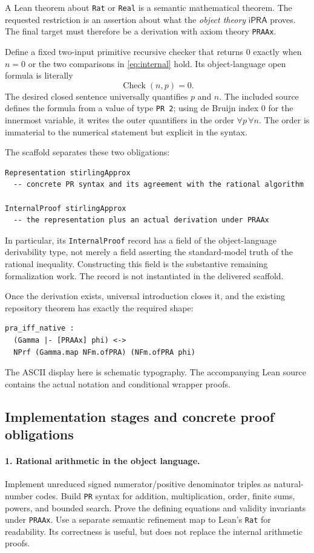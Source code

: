 \documentclass[11pt]{article}
\theoremstyle{definition}
\newcommand{\ipra}{\mathsf{iPRA}}
\newcommand{\ArithCheck}{\operatorname{Check}}
\begin{document}
A Lean theorem about \texttt{Rat} or \texttt{Real} is a semantic
mathematical theorem. The requested restriction is an assertion about what
the \emph{object theory} $\ipra$ proves. The final target must therefore
be a derivation with axiom theory \texttt{PRAAx}.

Define a fixed two-input primitive recursive checker that returns $0$
exactly when $n=0$ or the two comparisons in \eqref{eq:internal}
hold. Its object-language open formula is literally
\[
 \ArithCheck(n,p)=0.
\]
The desired closed sentence universally quantifies $p$ and $n$.
The included source defines the formula from a value of type
\texttt{PR 2}; using de Bruijn index $0$ for the innermost variable,
it writes the outer quantifiers in the order $\forall p\,\forall n$.
The order is immaterial to the numerical statement but explicit in the
syntax.

The scaffold separates these two obligations:
\begin{lstlisting}
Representation stirlingApprox
  -- concrete PR syntax and its agreement with the rational algorithm

InternalProof stirlingApprox
  -- the representation plus an actual derivation under PRAAx
\end{lstlisting}
In particular, its \texttt{InternalProof} record has a field of the
object-language derivability type, not merely a field asserting the
standard-model truth of the rational inequality. Constructing this field
is the substantive remaining formalization work. The record is not
instantiated in the delivered scaffold.

Once the derivation exists, universal introduction closes it, and the
existing repository theorem has exactly the required shape:
\begin{lstlisting}
pra_iff_native :
  (Gamma |- [PRAAx] phi) <->
  NPrf (Gamma.map NFm.ofPRA) (NFm.ofPRA phi)
\end{lstlisting}
The ASCII display here is schematic typography. The accompanying Lean
source contains the actual notation and conditional wrapper proofs.

\subsection{Implementation stages and concrete proof obligations}

\paragraph{1. Rational arithmetic in the object language.}
Implement unreduced signed numerator/positive denominator triples as
natural-number codes. Build \texttt{PR} syntax for addition,
multiplication, order, finite sums, powers, and bounded search. Prove the
defining equations and validity invariants under \texttt{PRAAx}.
Use a separate semantic refinement map to Lean's \texttt{Rat} for
readability. Its correctness is useful, but does not replace the internal
arithmetic proofs.
\end{document}

